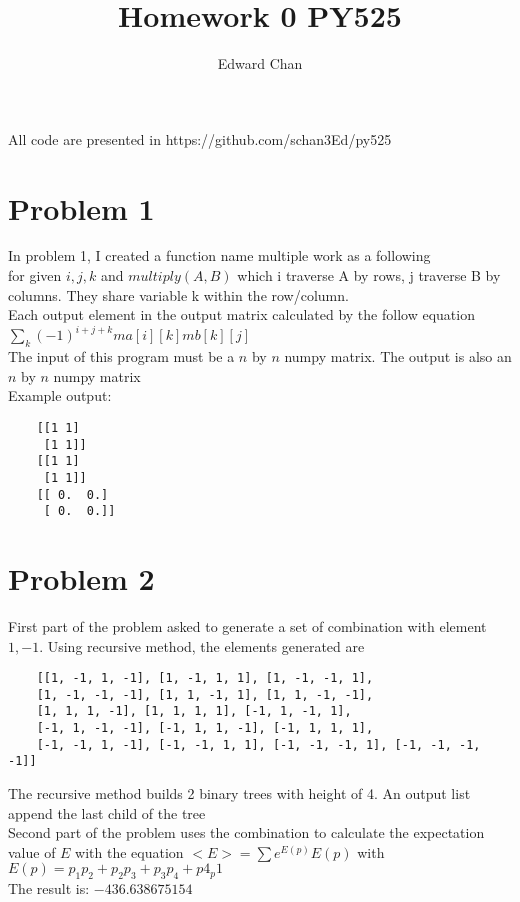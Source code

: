 \documentclass[a4paper]{article}
\title{Homework 0
    PY525}
\author{Edward Chan}
\begin{document}
    \maketitle
    All code are presented in https://github.com/schan3Ed/py525
    \section{Problem 1}
    In problem 1, I created a function name multiple work as a following
    \\ for given $i, j, k$ and $multiply(A, B)$ which i traverse A by rows, j traverse B by columns. They share variable k within the row/column. 
    \\ Each output element in the output matrix calculated by the follow equation
    \\ $\sum_{k}(-1)^{i + j + k} ma[i][k] mb[k][j] $
    \\ The input of this program must be a $n$ by $n$ numpy matrix. The output is also an $n$ by $n$ numpy matrix
    \\ Example output:
    \begin{verbatim}
    [[1 1]
     [1 1]]
    [[1 1]
     [1 1]]
    [[ 0.  0.]
     [ 0.  0.]]
    \end{verbatim}
    \section{Problem 2}
    First part of the problem asked to generate a set of combination with element $1, -1$. Using recursive method, the elements generated are
    \begin{verbatim}
    [[1, -1, 1, -1], [1, -1, 1, 1], [1, -1, -1, 1], 
    [1, -1, -1, -1], [1, 1, -1, 1], [1, 1, -1, -1], 
    [1, 1, 1, -1], [1, 1, 1, 1], [-1, 1, -1, 1], 
    [-1, 1, -1, -1], [-1, 1, 1, -1], [-1, 1, 1, 1], 
    [-1, -1, 1, -1], [-1, -1, 1, 1], [-1, -1, -1, 1], [-1, -1, -1, -1]]
    \end{verbatim}
    The recursive method builds 2 binary trees with height of 4. An output list append the last child of the tree
    \\Second part of the problem uses the combination to calculate the expectation value of $E$ with the equation $<E> = \sum e^{E(p)}E(p)$ with $E(p) = p_1p_2 + p_2p_3 + p_3p_4 + p4_p1$
    \\ The result is: $-436.638675154$
    
\end{document}
